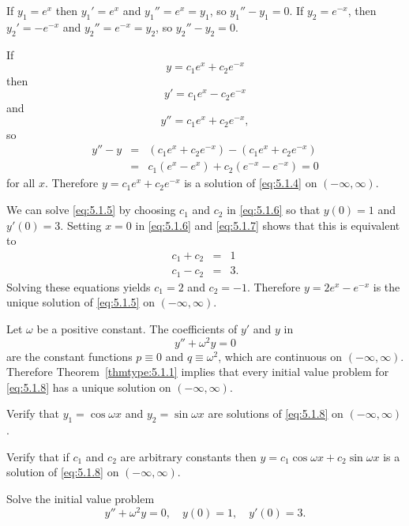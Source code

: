 \begin{examplesolution}
 If $y_{1}=e^{x}$ then $y_{1}'=e^{x}$ and $y_{1}''=e^{x}=y_{1}$, so
$y_{1}''-y_{1}=0$. If $y_{2}=e^{-x}$, then $y_{2}'=-e^{-x}$ and $y_{2}''=e^{-x}=y_{2}$, so
$y_{2}''-y_{2}=0$.

 If
\begin{equation}
  \label{eq:5.1.6}y=c_{1}e^{x}+c_{2}e^{-x}
\end{equation}
then
\begin{equation}
  \label{eq:5.1.7}y'=c_{1}e^{x}-c_{2}e^{-x}
\end{equation}
and
\[
  y''=c_{1}e^{x}+c_{2}e^{-x},
\]
so
\begin{eqnarray*}
  y''-y & = & (c_{1}e^{x}+c_{2}e^{-x})-(c_{1}e^{x}+c_{2}e^{-x}) \\
        & = & c_{1}(e^{x}-e^{x})+c_{2}(e^{-x}-e^{-x})=0
\end{eqnarray*}
for all $x$. Therefore $y=c_{1}e^{x}+c_{2}e^{-x}$ is a solution of \eqref{eq:5.1.4} on
$(-\infty,\infty)$.

 We can solve \eqref{eq:5.1.5} by choosing $c_{1}$ and $c_{2}$ in \eqref{eq:5.1.6}
so that $y(0)=1$ and $y'(0)=3$. Setting $x=0$ in \eqref{eq:5.1.6} and \eqref{eq:5.1.7} shows that
this is equivalent to
\begin{eqnarray*}
  c_{1}+c_{2} & = & 1 \\
  c_{1}-c_{2} & = & 3.
\end{eqnarray*}
Solving these equations yields $c_{1}=2$ and $c_{2}=-1$. Therefore $y=2e^{x}-e^{-x}$ is the unique
solution of \eqref{eq:5.1.5} on $(-\infty,\infty)$.
\end{examplesolution}

\begin{example}
  \label{example:5.1.2} \rm %
  Let $\omega$ be a positive constant. The coefficients of $y'$ and $y$ in
  \begin{equation}
    \label{eq:5.1.8}y''+\omega^{2}y=0
  \end{equation}
  are the constant functions $p\equiv0$ and $q\equiv\omega^{2}$, which are continuous on
  $(-\infty,\infty)$. Therefore Theorem~\ref{thmtype:5.1.1} implies that every initial value problem
  for \eqref{eq:5.1.8} has a unique solution on $(-\infty,\infty)$.
  \begin{alist}
    \item %
    Verify that $y_{1}=\cos\omega x$ and $y_{2}=\sin\omega x$ are solutions of \eqref{eq:5.1.8} on
    $(-\infty,\infty)$.

    \item %
    Verify that if $c_{1}$ and $c_{2}$ are arbitrary constants then
    $y=c_{1}\cos\omega x+c_{2}\sin\omega x$ is a solution of \eqref{eq:5.1.8} on $(-\infty,\infty)$.

    \item %
    Solve the initial value problem
    \begin{equation}
      \label{eq:5.1.9}y''+\omega^{2}y=0,\quad y(0)=1,\quad y'(0)=3.
    \end{equation}
  \end{alist}
\end{example}


